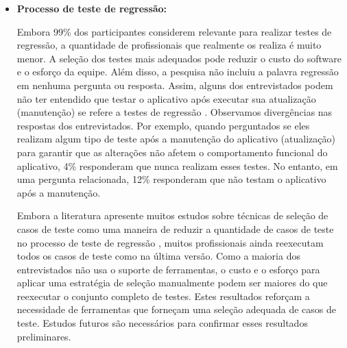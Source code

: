 \begin{itemize}
\item \textbf{Processo de teste de regressão:} 

Embora 99\% dos participantes considerem relevante para realizar testes de regressão, a quantidade de profissionais que realmente os realiza é muito menor. A seleção dos testes mais adequados pode reduzir o custo do software e o esforço da equipe. Além disso, a pesquisa não incluiu a palavra regressão em nenhuma pergunta ou resposta. Assim, alguns dos entrevistados podem não ter entendido que testar o aplicativo após executar sua atualização (manutenção) se refere a testes de regressão \cite{65194}. Observamos divergências nas respostas dos entrevistados. Por exemplo, quando perguntados se eles realizam algum tipo de teste após a manutenção do aplicativo (atualização) para garantir que as alterações não afetem o comportamento funcional do aplicativo, 4\% responderam que nunca realizam esses testes. No entanto, em uma pergunta relacionada, 12\% responderam que não testam o aplicativo após a manutenção.
 
Embora a literatura apresente muitos estudos sobre técnicas de seleção de casos de teste como uma maneira de reduzir a quantidade de casos de teste no processo de teste de regressão \cite{ENGSTROM201014, KAZMI2017, 65194, WHITE1991, 536955}, muitos profissionais ainda reexecutam todos os casos de teste como na última versão. Como a maioria dos entrevistados não usa o suporte de ferramentas, o custo e o esforço para aplicar uma estratégia de seleção manualmente podem ser maiores do que reexecutar o conjunto completo de testes. Estes resultados reforçam a necessidade de ferramentas que forneçam uma seleção adequada de casos de teste. Estudos futuros são necessários para confirmar esses resultados preliminares.

\end{itemize}



